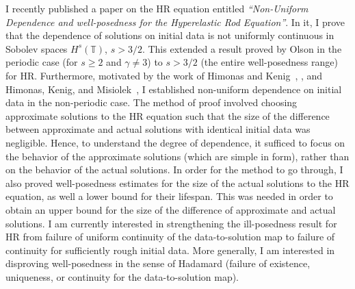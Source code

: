 \documentclass[12pt,reqno]{amsart}
\newcommand{\ci}{\mathbb{T}}
\begin{document}
I recently published a paper on the HR equation entitled 
{\it ``Non-Uniform Dependence  and well-posedness
for the
Hyperelastic Rod Equation''}. In it, I prove
that 
the dependence of solutions on initial data is not uniformly 
continuous in Sobolev spaces $H^s(\ci)$, $s>3/2$.
This extended a result proved by Olson 
\cite{Olson_2006_Non-uniform-dep} in the periodic
case (for $s\ge 2$ and $\gamma \ne 3$)  to  $s>3/2$ (the entire well-posedness
range) for HR\@. Furthermore, motivated by the work of Himonas and
Kenig~\cite{Himonas:2009fk}, \cite{Himonas:2009fk}, and 
Himonas, Kenig, and Misiolek~\cite{Himonas_2009_Non-uniform-dep-per},
I established non-uniform dependence on initial data
in the non-periodic case.
The method of proof involved choosing
approximate solutions to the HR equation such that the size of the difference between approximate and actual solutions with 
identical initial data was negligible. Hence, to understand the degree of 
dependence, it sufficed to focus on the behavior of the approximate 
solutions (which are simple in form), rather than on the behavior of the 
actual solutions. In order for the method to go through, I also proved 
well-posedness estimates for the size of the 
actual solutions to the HR equation, as well a 
lower bound for their lifespan. This was needed in order to obtain an upper
bound for the size of the difference of approximate and actual solutions. I am
currently interested in strengthening the ill-posedness result for HR from
failure of uniform continuity of the data-to-solution map to failure of
continuity for sufficiently rough initial data. More generally, I am interested
in disproving well-posedness in the sense of Hadamard (failure of existence,
uniqueness, or continuity for the data-to-solution map). 
\end{document}
